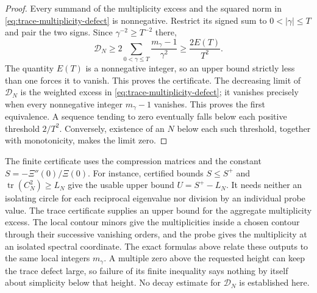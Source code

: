 \begin{proof}
Every summand of the multiplicity excess and the squared norm in
\eqref{eq:trace-multiplicity-defect} is nonnegative. Restrict its signed
sum to $0<|\gamma|\le T$ and pair the two signs. Since
$\gamma^{-2}\ge T^{-2}$ there,
\[
 \mathcal D_N\ge2\sum_{0<\gamma\le T}
       \frac{m_\gamma-1}{\gamma^2}\ge\frac{2E(T)}{T^2}.
\]
The quantity $E(T)$ is a nonnegative integer, so an upper bound strictly
less than one forces it to vanish. This proves the certificate.
The decreasing limit of $\mathcal D_N$ is the weighted excess in
\eqref{eq:trace-multiplicity-defect}; it vanishes precisely when every
nonnegative integer $m_\gamma-1$ vanishes. This proves the first
equivalence. A sequence tending to zero eventually falls below each
positive threshold $2/T^2$. Conversely, existence of an $N$ below each
such threshold, together with monotonicity, makes the limit zero.
\end{proof}

The finite certificate uses the compression matrices and the constant
$S=-\Xi''(0)/\Xi(0)$. For instance, certified bounds
$S\le S^+$ and $\operatorname{tr}(C_N^2)\ge L_N$ give the usable upper
bound $U=S^+-L_N$. It needs neither an isolating circle for each
reciprocal eigenvalue nor division by an individual probe value.
The trace certificate supplies an upper bound for the aggregate
multiplicity excess. The local contour minors give the multiplicities
inside a chosen contour through their successive vanishing orders,
and the probe gives the multiplicity at an isolated spectral coordinate.
The exact formulas above relate these outputs to the same local
integers $m_\gamma$. A multiple zero above the requested height can
keep the trace defect large, so failure of its finite inequality says
nothing by itself about simplicity below that height. No decay estimate
for $\mathcal D_N$ is established here.
